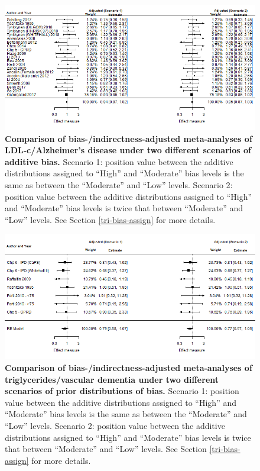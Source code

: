 \documentclass[a4paper, twoside]{templates/ociamthesis}
\begin{document}
\begin{figure}[H]
\includegraphics[width=1\linewidth]{figures/tri/fp_paired_midlife_ldl_ad_scenarios} \caption[Comparison of bias-/indirectness-adjusted meta-analyses of LDL-c/Alzheimer's disease under two different scenarios of additive bias.]{\textbf{Comparison of bias-/indirectness-adjusted meta-analyses of LDL-c/Alzheimer's disease under two different scenarios of additive bias.} Scenario 1: position value between the additive distributions assigned to ``High'' and ``Moderate'' bias levels is the same as between the ``Moderate'' and ``Low'' levels. Scenario 2: position value between the additive distributions assigned to ``High'' and ``Moderate'' bias levels is twice that between ``Moderate'' and ``Low'' levels. See Section \ref{tri-bias-assign} for more details.}\label{fig:fpLdlAdComparison}
\end{figure}





\begin{figure}[H]
\includegraphics[width=1\linewidth]{figures/tri/fp_paired_midlife_tg_vad_scenarios} \caption[Comparison of bias-/indirectness-adjusted meta-analyses of triglycerides/vascular dementia under two different scenarios of prior distributions of bias.]{\textbf{Comparison of bias-/indirectness-adjusted meta-analyses of triglycerides/vascular dementia under two different scenarios of prior distributions of bias.} Scenario 1: position value between the additive distributions assigned to ``High'' and ``Moderate'' bias levels is the same as between the ``Moderate'' and ``Low'' levels. Scenario 2: position value between the additive distributions assigned to ``High'' and ``Moderate'' bias levels is twice that between ``Moderate'' and ``Low'' levels. See Section \ref{tri-bias-assign} for more details.}\label{fig:fpTgVaDComparison}
\end{figure}
\end{document}
